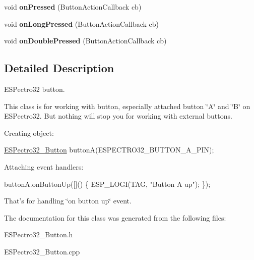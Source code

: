 \begin{DoxyCompactItemize}
\item 
\hypertarget{classESPectro32__Button_a6c3d37c08d1ae0575417f6e9f0d7bd66}{void {\bfseries on\-Pressed} (Button\-Action\-Callback cb)}\label{classESPectro32__Button_a6c3d37c08d1ae0575417f6e9f0d7bd66}

\item 
\hypertarget{classESPectro32__Button_ad387123c630859eab0e0f85a8ede4679}{void {\bfseries on\-Long\-Pressed} (Button\-Action\-Callback cb)}\label{classESPectro32__Button_ad387123c630859eab0e0f85a8ede4679}

\item 
\hypertarget{classESPectro32__Button_aaa428fdecf890c9d2ca7ce9bd5d02b45}{void {\bfseries on\-Double\-Pressed} (Button\-Action\-Callback cb)}\label{classESPectro32__Button_aaa428fdecf890c9d2ca7ce9bd5d02b45}

\end{DoxyCompactItemize}


\subsection{Detailed Description}
E\-S\-Pectro32 button. 

This class is for working with button, especially attached button \char`\"{}\-A\char`\"{} and \char`\"{}\-B\char`\"{} on E\-S\-Pectro32. But nothing will stop you for working with external buttons.

Creating object\-: 
\begin{DoxyCode}
\hyperlink{classESPectro32__Button}{ESPectro32\_Button} buttonA(ESPECTRO32\_BUTTON\_A\_PIN);
\end{DoxyCode}


Attaching event handlers\-:


\begin{DoxyCode}
buttonA.onButtonUp([]() \{
    ESP\_LOGI(TAG, \textcolor{stringliteral}{"Button A up"});
\});
\end{DoxyCode}


That's for handling \char`\"{}on button up\char`\"{} event. 

The documentation for this class was generated from the following files\-:\begin{DoxyCompactItemize}
\item 
E\-S\-Pectro32\-\_\-\-Button.\-h\item 
E\-S\-Pectro32\-\_\-\-Button.\-cpp\end{DoxyCompactItemize}
